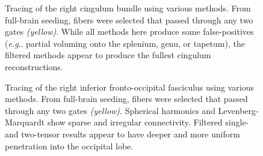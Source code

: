 \documentclass[final,hyperref]{gatech-thesis}
\makeatletter
\DeclareRobustCommand\onedot{\futurelet\@let@token\@onedot}
\def\@onedot{\ifx\@let@token.\else.\null\fi\xspace}
\newcommand{\eg}{\textit{e.g}\onedot}
\makeatother
\begin{document}
\begin{figure}[t]
  \centering

  \caption{Tracing of the right cingulum bundle using various methods.  From
    full-brain seeding, fibers were selected that passed through any two gates
    \textit{(yellow)}.  While all methods here produce some false-positives
    (\eg partial voluming onto the splenium, genu, or tapetum), the filtered
    methods appear to produce the fullest cingulum reconstructions.}
  \label{fig:cing}
\end{figure}




\begin{figure}[t]
  \centering


  \caption{Tracing of the right inferior fronto-occipital fasciculus using
    various methods.  From full-brain seeding, fibers were selected that
    passed through any two gates \textit{(yellow)}.  Spherical harmonics and
    Levenberg-Marquardt show sparse and irregular connectivity.  Filtered
    single- and two-tensor results appear to have deeper and more uniform
    penetration into the occipital lobe.}
  \label{fig:ioff}
\end{figure}
\end{document}
